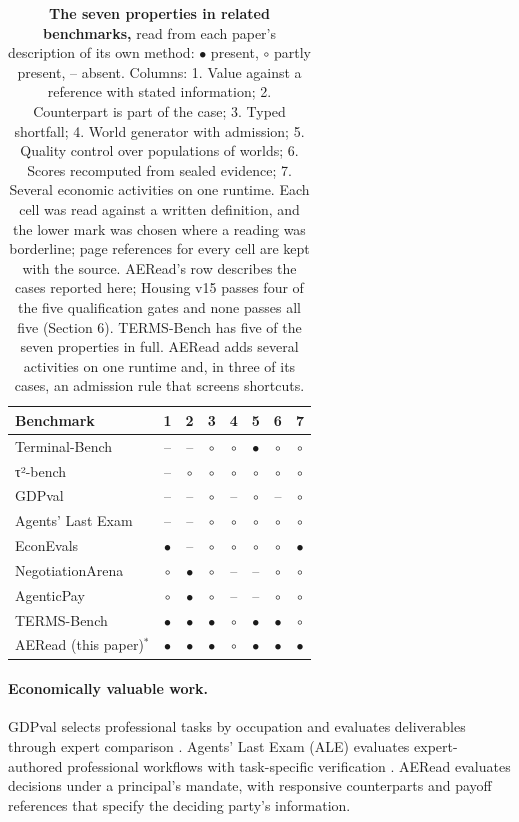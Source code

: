 \begin{table}[htbp]\centering\small\renewcommand{\thetable}{2.1}
\caption{\textbf{The seven properties in related benchmarks,} read from each paper's description of its own method: $\bullet$ present, $\circ$ partly present, -- absent. Columns: 1. Value against a reference with stated information; 2. Counterpart is part of the case; 3. Typed shortfall; 4. World generator with admission; 5. Quality control over populations of worlds; 6. Scores recomputed from sealed evidence; 7. Several economic activities on one runtime. Each cell was read against a written definition, and the lower mark was chosen where a reading was borderline; page references for every cell are kept with the source. AERead's row describes the cases reported here; Housing v15 passes four of the five qualification gates and none passes all five (Section 6). TERMS-Bench has five of the seven properties in full. AERead adds several activities on one runtime and, in three of its cases, an admission rule that screens shortcuts.}
\label{tab:comparison}
\begin{tabular}{lccccccc}
\toprule
Benchmark & 1 & 2 & 3 & 4 & 5 & 6 & 7 \\
\midrule
Terminal-Bench & -- & -- & $\circ$ & $\circ$ & $\bullet$ & $\circ$ & $\circ$ \\
τ²-bench & -- & $\circ$ & $\circ$ & $\circ$ & $\circ$ & $\circ$ & $\circ$ \\
GDPval & -- & -- & $\circ$ & -- & $\circ$ & -- & $\circ$ \\
Agents' Last Exam & -- & -- & $\circ$ & $\circ$ & $\circ$ & $\circ$ & $\circ$ \\
EconEvals & $\bullet$ & -- & $\circ$ & $\circ$ & $\circ$ & $\circ$ & $\bullet$ \\
NegotiationArena & $\circ$ & $\bullet$ & $\circ$ & -- & -- & $\circ$ & $\circ$ \\
AgenticPay & $\circ$ & $\bullet$ & $\circ$ & -- & -- & $\circ$ & $\circ$ \\
TERMS-Bench & $\bullet$ & $\bullet$ & $\bullet$ & $\circ$ & $\bullet$ & $\bullet$ & $\circ$ \\
AERead (this paper)$^{*}$ & $\bullet$ & $\bullet$ & $\bullet$ & $\circ$ & $\bullet$ & $\bullet$ & $\bullet$ \\
\bottomrule
\end{tabular}
\end{table}


\paragraph{Economically valuable work.}
GDPval selects professional tasks by occupation and evaluates deliverables
through expert comparison \citep{patwardhan2025gdpval}. Agents' Last Exam
(ALE) evaluates expert-authored professional workflows with task-specific
verification \citep{sun2026agentslastexam}. AERead evaluates decisions
under a principal's mandate, with responsive counterparts and payoff
references that specify the deciding party's information.


